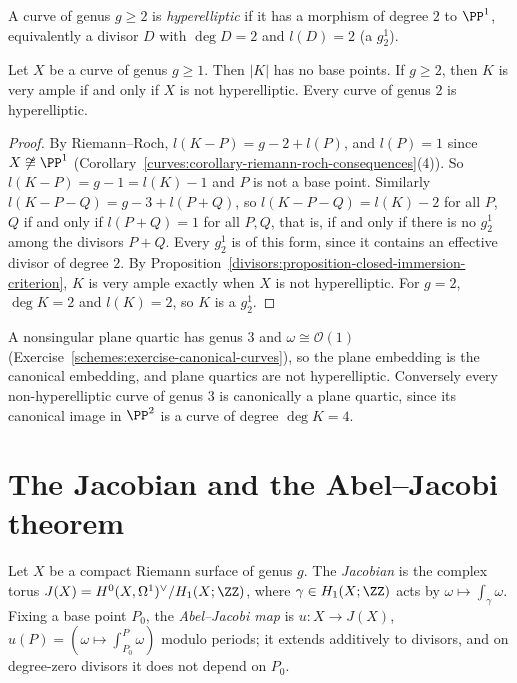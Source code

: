 \begin{definition}\label{curves:definition-hyperelliptic}
A curve of genus $g \geq 2$ is \emph{hyperelliptic} if it has a morphism of degree $2$ to $\PP^1$, equivalently a divisor $D$ with $\deg D = 2$ and $l(D) = 2$ (a $g^1_2$).
\end{definition}

\begin{theorem}\label{curves:theorem-canonical}
Let $X$ be a curve of genus $g \geq 1$. Then $|K|$ has no base points. If $g \geq 2$, then $K$ is very ample if and only if $X$ is not hyperelliptic. Every curve of genus $2$ is
hyperelliptic.
\end{theorem}

\begin{proof}
By Riemann--Roch, $l(K - P) = g - 2 + l(P)$, and $l(P) = 1$ since $X \not\cong \PP^1$ (Corollary~\ref{curves:corollary-riemann-roch-consequences}(4)). So $l(K - P) = g - 1 = l(K) - 1$
and $P$ is not a base point. Similarly $l(K - P - Q) = g - 3 + l(P + Q)$, so $l(K - P - Q) = l(K) - 2$ for all $P$, $Q$ if and only if $l(P + Q) = 1$ for all $P, Q$, that is, if
and only if there is no $g^1_2$ among the divisors $P + Q$. Every $g^1_2$ is of this form, since it contains an effective divisor of degree $2$. By
Proposition~\ref{divisors:proposition-closed-immersion-criterion}, $K$ is very ample exactly when $X$ is not hyperelliptic. For $g = 2$, $\deg K = 2$ and $l(K) = 2$, so $K$ is a
$g^1_2$.
\end{proof}

\begin{example}\label{curves:example-canonical}
A nonsingular plane quartic has genus $3$ and $\omega \cong \mathcal{O}(1)$ (Exercise~\ref{schemes:exercise-canonical-curves}), so the plane embedding is the canonical
embedding, and plane quartics are not hyperelliptic. Conversely every non-hyperelliptic curve of genus $3$ is canonically a plane quartic, since its canonical image
in $\PP^2$ is a curve of degree $\deg K = 4$.
\end{example}

\section{The Jacobian and the Abel--Jacobi theorem}\label{curves:section-jacobian}

\begin{definition}\label{curves:definition-jacobian}
Let $X$ be a compact Riemann surface of genus $g$. The \emph{Jacobian} is the complex torus $J(X) = H^0(X, \Omega^1)^\vee/H_1(X; \ZZ)$, where $\gamma \in H_1(X; \ZZ)$ acts by
$\omega \mapsto \int_\gamma\omega$. Fixing a base point $P_0$, the \emph{Abel--Jacobi map} is $u \colon X \to J(X)$, $u(P) = (\omega \mapsto \int_{P_0}^P\omega)$ modulo periods; it
extends additively to divisors, and on degree-zero divisors it does not depend on $P_0$.
\end{definition}

